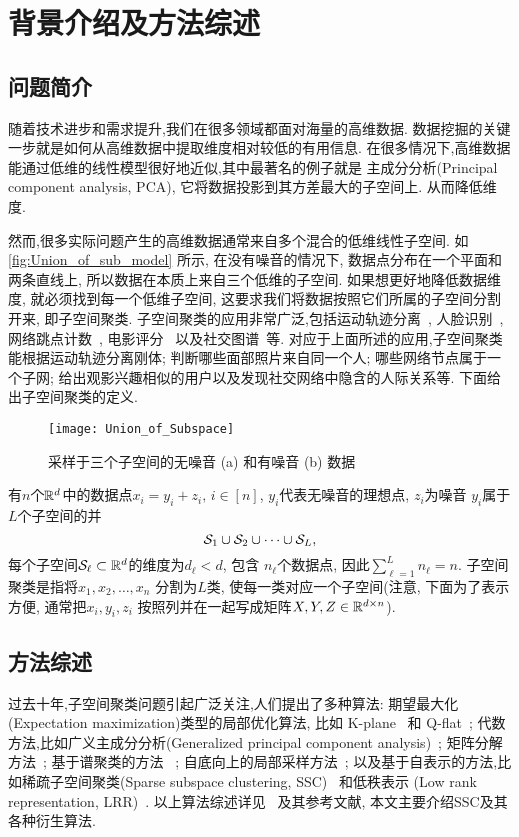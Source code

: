 \chapter{背景介绍及方法综述}\label{chp:intro}
\section{问题简介}
随着技术进步和需求提升,我们在很多领域都面对海量的高维数据. 
数据挖掘的关键一步就是如何从高维数据中提取维度相对较低的有用信息.
在很多情况下,高维数据能通过低维的线性模型很好地近似,其中最著名的例子就是
主成分分析(Principal component analysis, PCA), 它将数据投影到其方差最大的子空间上.
从而降低维度.

然而,很多实际问题产生的高维数据通常来自多个混合的低维线性子空间.
如\autoref{fig:Union_of_sub_model} 所示, 在没有噪音的情况下,
数据点分布在一个平面和两条直线上, 所以数据在本质上来自三个低维的子空间.
如果想更好地降低数据维度, 就必须找到每一个低维子空间,
这要求我们将数据按照它们所属的子空间分割开来, 即子空间聚类.
子空间聚类的应用非常广泛,包括运动轨迹分离~\cite{costeira1998multibody},
人脸识别~\cite{basri2003lambertian},网络跳点计数~\cite{eriksson2011high},
电影评分~\cite{zhang2012guess} 以及社交图谱~\cite{chen2014clustering}等.
对应于上面所述的应用,子空间聚类能根据运动轨迹分离刚体;
判断哪些面部照片来自同一个人; 哪些网络节点属于一个子网;
给出观影兴趣相似的用户以及发现社交网络中隐含的人际关系等.
下面给出子空间聚类的定义.
\begin{figure}[tb]
  \centering
  \texttt{[image: Union\_of\_Subspace]}
  \caption{采样于三个子空间的无噪音 (a) 和有噪音 (b) 数据}\label{fig:Union_of_sub_model}
\end{figure}
\begin{definition}\label{def:sc}
  有\(n\)个\(\mathbb{R}^d\)中的数据点\(x_i = y_i+z_i, \, i \in [n]\),
  \(y_i\)代表无噪音的理想点, \(z_i\)为噪音
  \(y_i\)属于\(L\)个子空间的并
  \[\mathcal{S}_1 \cup \mathcal{S}_2 \cup\cdots\cup \mathcal{S}_L,\]
  每个子空间\(\mathcal{S}_\ell \subset \mathbb{R}^d\)的维度为\(d_{\ell} < d\),
  包含 \(n_{\ell}\)个数据点, 因此\(\sum_{\ell=1}^L n_\ell=n\). 
  子空间聚类是指将\(x_1, x_2, \ldots, x_n\) 分割为\(L\)类,
  使每一类对应一个子空间(注意, 下面为了表示方便, 通常把\(x_i, y_i, z_i\)
  按照列并在一起写成矩阵\(X, Y, Z\in \mathbb{R}^{d\times n}\)).
\end{definition}
\section{方法综述}
过去十年,子空间聚类问题引起广泛关注,人们提出了多种算法:
期望最大化(Expectation maximization)类型的局部优化算法,
比如 K-plane~\cite{bradley2000k} 和 Q-flat~\cite{tseng2000nearest};
代数方法,比如广义主成分分析(Generalized principal component analysis)~\cite{vidal2005generalized};
矩阵分解方法~\cite{costeira1995multi,costeira1998multibody}; 基于谱聚类的方法
~\cite{chen2009spectral,lauer2009spectral}; 自底向上的局部采样方法~\cite{rao2008motion,yan2006general};
以及基于自表示的方法,比如稀疏子空间聚类(Sparse subspace clustering, SSC)~\cite{elhamifar2009sparse,elhamifar2013sparse}
和低秩表示 (Low rank representation, LRR)~\cite{liu2010robust,liu2013robust}.
以上算法综述详见~\cite{vidal2010tutorial} 及其参考文献,
本文主要介绍SSC及其各种衍生算法.

